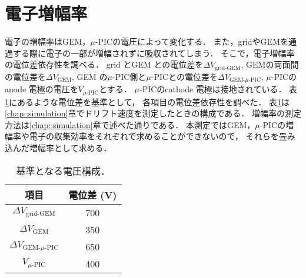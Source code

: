 \documentclass[../master]{subfiles}
\begin{document}
\section{電子増幅率}
電子の増幅率はGEM，$\mu$-PICの電圧によって変化する．
また，gridやGEMを通過する際に電子の一部が増幅されずに吸収されてしまう．
そこで，電子増幅率の電位差依存性を調べる．
grid とGEM との電位差を$\Delta V_{\text{grid-GEM}}$, GEMの両面間の電位差を$\Delta V_{\text{GEM}}$,
GEM の$\mu$-PIC側と$\mu$-PICとの電位差を$\Delta V_{\text{GEM-}\mu\text{-PIC}}$,
$\mu$-PICのanode 電極の電圧を$V_{\mu\text{-PIC}}$とする．
$\mu$-PICのcathode 電極は接地されている．
表\ref{tab::voltage_configuration}にあるような電位差を基準として，
各項目の電位差依存性を調べた．
表\ref{tab::voltage_configuration}は\ref{chap::simulation}章でドリフト速度を測定したときの構成である．
増幅率の測定方法は\ref{chap::simulation}章で述べた通りである．
本測定ではGEM，$\mu$-PICの増幅率や電子の収集効率をそれぞれで求めることができないので，
それらを畳み込んだ増幅率として求める．
\begin{table}
  \centering
  \caption{基準となる電圧構成．}
  \label{tab::voltage_configuration}
%  
  \begin{tabular}{cc}
    \toprule
    項目 & 電位差 (\si{\volt}) \\
    \midrule
    $\Delta V_{\text{grid-GEM}}$ & 700 \\
    $\Delta V_{\text{GEM}}$ & 350 \\
    $\Delta V_{\text{GEM-}\mu\text{-PIC}}$ & 650 \\
    $V_{\mu\text{-PIC}}$ & 400 \\
    \bottomrule
  \end{tabular}
\end{table}

\end{document}
